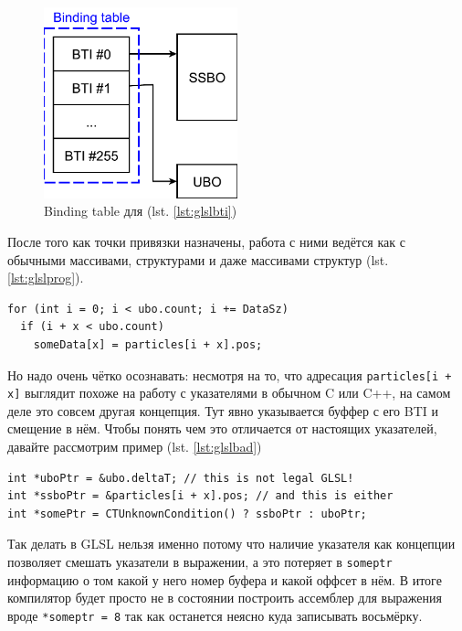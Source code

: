 \documentclass[a4paper,12pt,oneside]{article}
\begin{document}
\begin{figure}
\centering
\includegraphics[width=0.5\textwidth]{pictures/bti-idea.pdf}
\caption{Binding table для (lst. \ref{lst:glslbti})}
\label{fig:bti-idea}
\end{figure}

После того как точки привязки назначены, работа с ними ведётся как с обычными массивами, структурами и даже массивами структур (lst. \ref{lst:glslprog}).

\begin{lstlisting}[caption={Работа с UBO и SSBO на GLSL},label={lst:glslprog}]
for (int i = 0; i < ubo.count; i += DataSz)
  if (i + x < ubo.count)
    someData[x] = particles[i + x].pos;
\end{lstlisting}

Но надо очень чётко осознавать: несмотря на то, что адресация \lstinline!particles[i + x]! выглядит похоже на работу с указателями в обычном C или C++, на самом деле это совсем другая концепция. Тут явно указывается буффер с его BTI и смещение в нём. Чтобы понять чем это отличается от настоящих указателей, давайте рассмотрим пример (lst. \ref{lst:glslbad})

\begin{lstlisting}[caption={Отсутствие настоящих указателей в GLSL},label={lst:glslbad}]
int *uboPtr = &ubo.deltaT; // this is not legal GLSL!
int *ssboPtr = &particles[i + x].pos; // and this is either
int *somePtr = CTUnknownCondition() ? ssboPtr : uboPtr;
\end{lstlisting}

Так делать в GLSL нельзя именно потому что наличие указателя как концепции позволяет смешать указатели в выражении, а это потеряет в \lstinline!someptr! информацию о том какой у него номер буфера и какой оффсет в нём.
В итоге компилятор будет просто не в состоянии построить ассемблер для выражения вроде \lstinline!*someptr = 8! так как останется неясно куда записывать восьмёрку.
\end{document}
